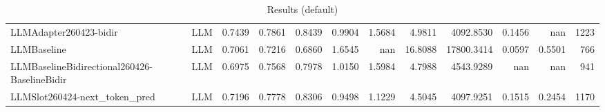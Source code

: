 \begin{table}[htbp]
{\begin{tabular}{ll|rrrrrrrrr|r}
LLMAdapter260423-bidir & LLM & 0.7439 & 0.7861 & 0.8439 & 0.9904 & 1.5684 & 4.9811 & 4092.8530 & 0.1456 & nan & 1223 \\
LLMBaseline & LLM & 0.7061 & 0.7216 & 0.6860 & 1.6545 & nan & 16.8088 & 17800.3414 & 0.0597 & 0.5501 & 766 \\
LLMBaselineBidirectional260426-BaselineBidir & LLM & 0.6975 & 0.7568 & 0.7978 & 1.0150 & 1.5984 & 4.7988 & 4543.9289 & nan & nan & 941 \\
LLMSlot260424-next\_token\_pred & LLM & 0.7196 & 0.7778 & 0.8306 & 0.9498 & 1.1229 & 4.5045 & 4097.9251 & 0.1515 & 0.2454 & 1170 \\
\bottomrule
\end{tabular}
}
\caption{Results (default)}
\label{tab:results_default}
\end{table}